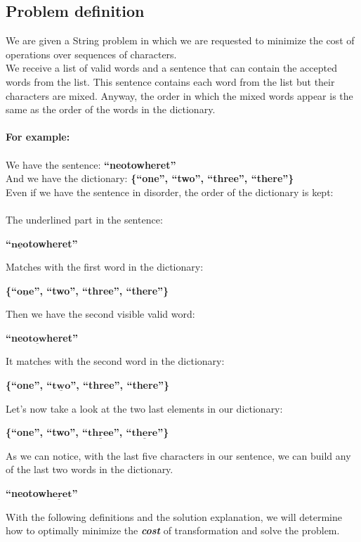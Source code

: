 \documentclass{article}
\begin{document}
	\subsection{Problem definition}
	We are given a String problem in which we are requested to
	minimize the cost of operations over sequences of characters.
	\\
	We receive a list of valid words and a sentence that can
	contain the accepted words from the list. This sentence
	contains each word from the list but their characters are
	mixed. Anyway, the order in which the mixed words appear
	is the same as the order of the words in the dictionary.
	\\
	\\
	\textbf{For example:}
	\\
	\\
	We have the sentence: \textbf{``neotowheret''}
	\\
	And we have the dictionary: \textbf{\{``one'', ``two'', ``three'', ``there''\}}
	\\
	Even if we have the sentence in disorder, the order of
	the dictionary is kept:
	\\
	\\
	The underlined part in the sentence:
	\begin{center}
		\textbf{``$\underline{\textbf{neo}}$towheret''}
		\\
	\end{center}
	Matches with the first word in the dictionary:
	\begin{center}
		\textbf{\{``$\underline{\textbf{one}}$'', ``two'', ``three'', ``there''\}}
		\\
		\vspace{1pt}
	\end{center}
	Then we have the second visible valid word:
	\begin{center}
		\textbf{``neo$\underline{\textbf{tow}}$heret''}
		\\
	\end{center}
	It matches with the second word in the dictionary:
	\begin{center}
		\textbf{\{``one'', ``$\underline{\textbf{two}}$'', ``three'', ``there''\}}
		\\
	\end{center}
	Let's now take a look at the two last elements in
	our dictionary:
	\begin{center}
		\textbf{\{``one'', ``two'', ``$\underline{\textbf{three}}$'', ``$\underline{\textbf{there}}$''\}}
		\\
	\end{center}
	As we can notice, with the last five characters in
	our sentence, we can build any of the last two words
	in the dictionary.
	\\
	\begin{center}
		\textbf{``neotow$\underline{\textbf{heret}}$''}
		\\
	\end{center}
	With the following definitions and the solution explanation,
	we will determine how to optimally minimize the \emph{\textbf{cost}} of
	transformation and solve the problem.
\end{document}
